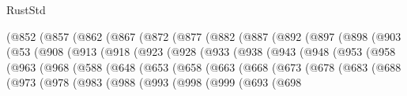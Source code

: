 \begin{lexlean}{RustStd}
\begin{coremodule}
        (@852
          (@857
            (@862
              (@867
                (@872
                  (@877
                    (@882
                      (@887
                        (@892
                          (@897
                            (@898
                              (@903
                                (@53
                                  (@908
                                    (@913
                                      (@918
                                        (@923
                                          (@928
                                            (@933
                                              (@938
                                                (@943
                                                  (@948
                                                    (@953
                                                      (@958
                                                        (@963
                                                          (@968
                                                            (@588
                                                              (@648
                                                                (@653
                                                                  (@658
                                                                    (@663
                                                                      (@668
                                                                        (@673
                                                                          (@678
                                                                            (@683
                                                                              (@688
                                                                                (@973
                                                                                  (@978
                                                                                    (@983
                                                                                      (@988
                                                                                        (@993
                                                                                          (@998
                                                                                            (@999
                                                                                              (@693
                                                                                                (@698

\end{coremodule}
\end{lexlean}
